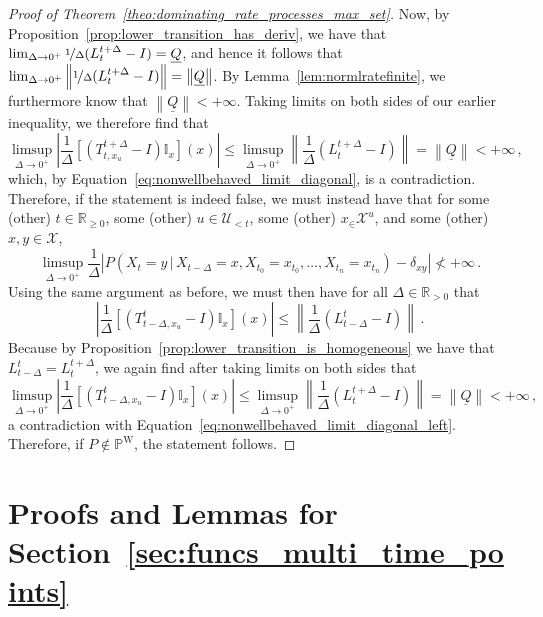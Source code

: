 \documentclass[10pt]{paper}
\theoremstyle{definition}
\newcommand{\reals}{\mathbb{R}}
\newcommand{\realspos}{\reals_{>0}}
\newcommand{\realsnonneg}{\reals_{\geq 0}}
\newcommand{\states}{\mathcal{X}}
\newcommand{\processes}{\mathbb{P}}
\newcommand{\wprocesses}{\processes^{\mathrm{W}}}
\newcommand{\ind}[1]{\mathbb{I}_{#1}}
\newcommand{\lrate}{\underline{Q}}
\newcommand{\norm}[1]{\left\lVert #1 \right\rVert}
\newcommand{\abs}[1]{\left\vert #1 \right\vert}
\begin{document}
\begin{proof}[Proof of Theorem~\ref{theo:dominating_rate_processes_max_set}]
Now, by Proposition~\ref{prop:lower_transition_has_deriv}, we have that $\lim_{\Delta\to0^+}\nicefrac{1}{\Delta}(L_{t}^{t+\Delta} - I) = \lrate$, and hence it follows that $\lim_{\Delta\to0^+}\norm{\nicefrac{1}{\Delta}(L_{t}^{t+\Delta} - I)} = \norm{\lrate}$. By Lemma~\ref{lem:normlratefinite}, we furthermore know that $\norm{\lrate}<+\infty$. Taking limits on both sides of our earlier inequality, we therefore find that
\begin{equation*}
\limsup_{\Delta\to0^+}\abs{\frac{1}{\Delta}\left[(T_{t,x_u}^{t+\Delta} - I)\ind{x}\right](x)} \leq \limsup_{\Delta\to0^+}\norm{\frac{1}{\Delta}(L_{t}^{t+\Delta} - I)} = \norm{\lrate} < +\infty\,,
\end{equation*}
which, by Equation~\eqref{eq:nonwellbehaved_limit_diagonal}, is a contradiction. Therefore, if the statement is indeed false, we must instead have that for some (other) $t\in\realsnonneg$, some (other) $u\in\mathcal{U}_{<t}$, some (other) $x_\in\states^u$, and some (other) $x,y\in\states$,
\begin{equation}\label{eq:nonwellbehaved_limit_diagonal_left}
\limsup_{\Delta\to0^+}\frac{1}{\Delta}\abs{P(X_{t}=y\,\vert\,X_{t-\Delta}=x,X_{t_0}=x_{t_0},\ldots,X_{t_n}=x_{t_n})-\delta_{xy}}\nless+\infty\,.
\end{equation}
Using the same argument as before, we must then have for all $\Delta\in\realspos$ that
\begin{equation*}
\abs{\frac{1}{\Delta}\left[(T_{t-\Delta,x_u}^t - I)\ind{x}\right](x)} \leq \norm{\frac{1}{\Delta}(L_{t-\Delta}^t - I)}\,.
\end{equation*}
Because by Proposition~\ref{prop:lower_transition_is_homogeneous} we have that $L_{t-\Delta}^t=L_t^{t+\Delta}$, we again find after taking limits on both sides that
\begin{equation*}
\limsup_{\Delta\to0^+}\abs{\frac{1}{\Delta}\left[(T_{t-\Delta,x_u}^t - I)\ind{x}\right](x)} \leq \limsup_{\Delta\to0^+}\norm{\frac{1}{\Delta}(L_{t}^{t+\Delta} - I)} = \norm{\lrate} < +\infty\,,
\end{equation*}
a contradiction with Equation~\eqref{eq:nonwellbehaved_limit_diagonal_left}. Therefore, if $P\notin\wprocesses$, the statement follows.
\end{proof}

\section{Proofs and Lemmas for Section~\ref{sec:funcs_multi_time_points}}
\end{document}
